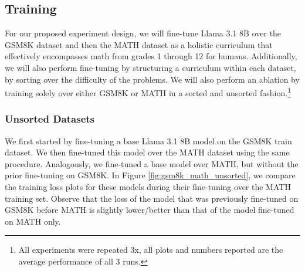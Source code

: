

\subsection{Training}
For our proposed experiment design, we will fine-tune Llama 3.1 8B over the GSM8K dataset and then the MATH dataset as a holistic curriculum that effectively encompasses math from grades 1 through 12 for humans. Additionally, we will also perform fine-tuning by structuring a curriculum within each dataset, by sorting over the difficulty of the problems. We will also perform an ablation by training solely over either GSM8K or MATH in a sorted and unsorted fashion.\footnote{All experiments were repeated 3x, all plots and numbers reported are the average performance of all 3 runs.}

\subsubsection{Unsorted Datasets}

We first started by fine-tuning a base Llama 3.1 8B model on the GSM8K train dataset. We then fine-tuned this model over the MATH dataset using the same procedure. Analogously, we fine-tuned a base model over MATH, but without the prior fine-tuning on GSM8K. In Figure \ref{fig:gsm8k_math_unsorted}, we compare the training loss plots for these models during their fine-tuning over the MATH training set. Observe that the loss of the model that was previously fine-tuned on GSM8K before MATH is slightly lower/better than that of the model fine-tuned on MATH only.

